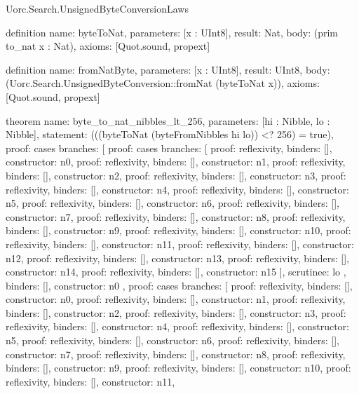\begin{lexlean}{Uorc.Search.UnsignedByteConversionLaws}
\begin{semanticmodule}
definition{
  name: byteToNat,
  parameters: [x : UInt8],
  result: Nat,
  body: (prim to_nat x : Nat),
  axioms: [Quot.sound, propext]
}

definition{
  name: fromNatByte,
  parameters: [x : UInt8],
  result: UInt8,
  body: (Uorc.Search.UnsignedByteConversion::fromNat (byteToNat x)),
  axioms: [Quot.sound, propext]
}

theorem{
  name: byte_to_nat_nibbles_lt_256,
  parameters: [hi : Nibble, lo : Nibble],
  statement: (((byteToNat (byteFromNibbles hi lo)) <? 256) = true),
  proof: cases{
    branches: [
      {
        proof: cases{
          branches: [
            {proof: reflexivity{}, binders: [], constructor: n0},
            {proof: reflexivity{}, binders: [], constructor: n1},
            {proof: reflexivity{}, binders: [], constructor: n2},
            {proof: reflexivity{}, binders: [], constructor: n3},
            {proof: reflexivity{}, binders: [], constructor: n4},
            {proof: reflexivity{}, binders: [], constructor: n5},
            {proof: reflexivity{}, binders: [], constructor: n6},
            {proof: reflexivity{}, binders: [], constructor: n7},
            {proof: reflexivity{}, binders: [], constructor: n8},
            {proof: reflexivity{}, binders: [], constructor: n9},
            {proof: reflexivity{}, binders: [], constructor: n10},
            {proof: reflexivity{}, binders: [], constructor: n11},
            {proof: reflexivity{}, binders: [], constructor: n12},
            {proof: reflexivity{}, binders: [], constructor: n13},
            {proof: reflexivity{}, binders: [], constructor: n14},
            {proof: reflexivity{}, binders: [], constructor: n15}
          ],
          scrutinee: lo
        },
        binders: [],
        constructor: n0
      },
      {
        proof: cases{
          branches: [
            {proof: reflexivity{}, binders: [], constructor: n0},
            {proof: reflexivity{}, binders: [], constructor: n1},
            {proof: reflexivity{}, binders: [], constructor: n2},
            {proof: reflexivity{}, binders: [], constructor: n3},
            {proof: reflexivity{}, binders: [], constructor: n4},
            {proof: reflexivity{}, binders: [], constructor: n5},
            {proof: reflexivity{}, binders: [], constructor: n6},
            {proof: reflexivity{}, binders: [], constructor: n7},
            {proof: reflexivity{}, binders: [], constructor: n8},
            {proof: reflexivity{}, binders: [], constructor: n9},
            {proof: reflexivity{}, binders: [], constructor: n10},
            {proof: reflexivity{}, binders: [], constructor: n11},
}}}}
\end{semanticmodule}
\end{lexlean}
